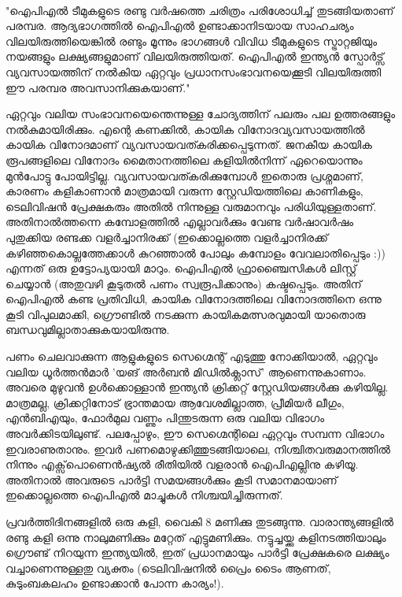 \vskip 2pt

‌\begin{framed}
"ഐപിഎല്‍ ടീമുകളുടെ രണ്ടു വര്‍ഷത്തെ ചരിത്രം പരിശോധിച്ച് തുടങ്ങിയതാണ് പരമ്പര. ആദ്യഭാഗത്തില്‍ ഐപിഎല്‍ 
ഉണ്ടാക്കാനിടയായ സാഹചര്യം വിലയിരുത്തിയെങ്കില്‍ രണ്ടും മൂന്നും ഭാഗങ്ങള്‍ വിവിധ ടീമുകളുടെ സ്ട്രാറ്റജിയും നയങ്ങളും 
ലക്ഷ്യങ്ങളുമാണ് വിലയിരുത്തിയത്. ഐപിഎല്‍ ഇന്ത്യന്‍ സ്പോര്‍ട്സ് വ്യവസായത്തിന് നല്‍കിയ ഏറ്റവും 
പ്രധാനസംഭാവനയെക്കൂടി വിലയിരുത്തി ഈ പരമ്പര അവസാനിക്കുകയാണ്."
\end{framed}

{\vskip 12pt}

ഏറ്റവും വലിയ സംഭാവനയെന്തെന്നുള്ള ചോദ്യത്തിന് പലരും പല ഉത്തരങ്ങളും നല്‍കുമായിരിക്കും. എന്റെ കണക്കില്‍, 
കായിക വിനോദവ്യവസായത്തില്‍ കായിക വിനോദമാണ് വ്യവസായവത്കരിക്കപ്പെടുന്നത്. ജനകീയ കായിക രൂപങ്ങളിലെ 
വിനോദം മൈതാനത്തിലെ കളിയില്‍നിന്ന് ഏറെയൊന്നും മുന്‍പോട്ടു പോയിട്ടില്ല. വ്യവസായവത്കരിക്കുമ്പോള്‍ ഇതൊരു 
പ്രശ്നമാണ്, കാരണം കളികാണാന്‍ മാത്രമായി വരുന്ന സ്റ്റേഡിയത്തിലെ കാണികളും, ടെലിവിഷന്‍ പ്രേക്ഷകരും അതില്‍ 
നിന്നുള്ള വരുമാനവും പരിധിയുള്ളതാണ്. അതിനാല്‍ത്തന്നെ കമ്പോളത്തില്‍ എല്ലാവര്‍ക്കും വേണ്ട വര്‍ഷാവര്‍ഷം പുതുക്കിയ 
രണ്ടക്ക വളര്‍ച്ചാനിരക്ക് (ഇക്കൊല്ലത്തെ വളര്‍ച്ചാനിരക്ക് കഴിഞ്ഞകൊല്ലത്തേക്കാള്‍ കുറഞ്ഞാല്‍ പോലും കമ്പോളം 
വേവലാതിപ്പെടും :)) എന്നത് ഒരു ഉട്ടോപ്യയായി മാറും. ഐപിഎല്‍ ഫ്രാഞ്ചൈസികള്‍ ലിസ്റ്റ് ചെയ്യാന്‍ (അതുവഴി കൂടുതല്‍ 
പണം സ്വരൂപിക്കാനും) കഷ്ടപ്പെടും. അതിന് ഐപിഎല്‍ കണ്ട പ്രതിവിധി, കായിക വിനോദത്തിലെ വിനോദത്തിനെ ഒന്നു 
കൂടി വിപുലമാക്കി, ഗ്രൌണ്ടില്‍ നടക്കുന്ന കായികമത്സരവുമായി യാതൊരു ബന്ധവുമില്ലാതാക്കുകയായിരുന്നു.

പണം ചെലവാക്കുന്ന ആളുകളുടെ സെഗ്മെന്റ് എടുത്തു നോക്കിയാല്‍, ഏറ്റവും വലിയ ധൂര്‍ത്തന്‍മാര്‍ 'യങ് അര്‍ബന്‍ 
മിഡില്‍ക്ലാസ്' ആണെന്നുകാണാം. അവരെ മുഴുവന്‍ ഉള്‍ക്കൊള്ളാന്‍ ഇന്ത്യന്‍ ക്രിക്കറ്റ് സ്റ്റേഡിയങ്ങള്‍ക്കു കഴിയില്ല. മാത്രമല്ല, 
ക്രിക്കറ്റിനോട് ഭ്രാന്തമായ ആവേശമില്ലാത്ത, പ്രീമിയര്‍ ലീഗും, എന്‍ബിഎയും, ഫോര്‍മുല വണ്ണും പിന്തുടരുന്ന ഒരു വലിയ വിഭാഗം 
അവര്‍ക്കിടയിലുണ്ട്. പലപ്പോഴും, ഈ സെഗ്മെന്റിലെ ഏറ്റവും സമ്പന്ന വിഭാഗം ഇവരാണുതാനും. ഇവര്‍ 
പണമൊഴുക്കിത്തുടങ്ങിയാലെ, നിശ്ചിതവരുമാനത്തില്‍ നിന്നും എക്സ്‌പൊണെന്‍ഷ്യല്‍ രീതിയില്‍ വളരാന്‍ ഐപിഎല്ലിനു 
കഴിയൂ. അതിനാല്‍ അവരുടെ പാര്‍ട്ടി സമയങ്ങള്‍ക്കും കൂടി സമാനമായാണ് ഇക്കൊല്ലത്തെ ഐപിഎല്‍ മാച്ചുകള്‍ 
നിശ്ചയിച്ചിരുന്നത്.


പ്രവര്‍ത്തിദിനങ്ങളില്‍ ഒരു കളി, വൈകി 8 മണിക്കു തുടങ്ങുന്നു. വാരാന്ത്യങ്ങളില്‍ രണ്ടു കളി ഒന്നു നാലുമണിക്കും മറ്റേത് 
എട്ടുമണിക്കും. നട്ടുച്ചയ്ക്കു കളിനടത്തിയാലും ഗ്രൌണ്ട് നിറയുന്ന ഇന്ത്യയില്‍, ഇത് പ്രധാനമായും പാര്‍ട്ടി പ്രേക്ഷകരെ ലക്ഷ്യം 
വച്ചാണെന്നുള്ളതു വ്യക്തം (ടെലിവിഷനില്‍ പ്രൈം ടൈം ആണത്, കുടുംബകലഹം ഉണ്ടാക്കാന്‍ പോന്ന കാര്യം!).

